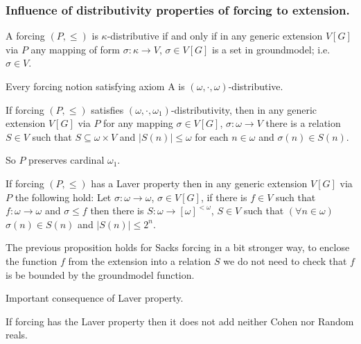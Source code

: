 \subsubsection*{Influence of distributivity properties of forcing to extension.}

\begin{proposition}
 A forcing $(P,\leq)$ is $\kappa$-distributive if and only if in any generic
extension $V[G]$ via $P$ any mapping of form $\sigma : \kappa \rightarrow V$,
$\sigma \in V[G]$ is a set in groundmodel; i.e. $\sigma \in V$.
\end{proposition}

\begin{fact}
 Every forcing notion satisfying axiom A is $(\omega,\cdot,\omega)$-distributive.
\end{fact}

\begin{proposition}
 If forcing $(P,\leq)$ satisfies $(\omega,\cdot,\omega_1)$-distributivity, then
in any generic extension $V[G]$ via $P$ for any mapping $\sigma \in V[G]$,
$\sigma : \omega \rightarrow V$ there is a relation $S \in V$ such that
$S \subseteq \omega \times V$ and $|S(n)| \leq \omega$ for each $n \in \omega$
and $\sigma(n) \in S(n)$.

So $P$ preserves cardinal $\omega_1$.
\end{proposition}

\begin{proposition}
 If forcing $(P,\leq)$ has a Laver property then in any generic extension $V[G]$
via $P$ the following hold:
Let $\sigma : \omega \rightarrow \omega$, $\sigma \in V[G]$, if there is
$f \in V$ such that $f:\omega \rightarrow \omega$ and $\sigma \leq f$ then
there is $S : \omega \rightarrow [\omega]^{< \omega}$, $S \in V$ such that
$(\forall n \in \omega)$ $\sigma(n) \in S(n)$ and $|S(n)| \leq 2^n$.
\end{proposition}

The previous proposition holds for Sacks forcing in a bit stronger way,
to enclose the function $f$ from the extension into a relation $S$ we
do not need to check that $f$ is be bounded by the groundmodel function.

\smallskip

Important consequence of Laver property.

\begin{proposition}
 If forcing has the Laver property then it does not add neither Cohen nor Random reals.
\end{proposition}


